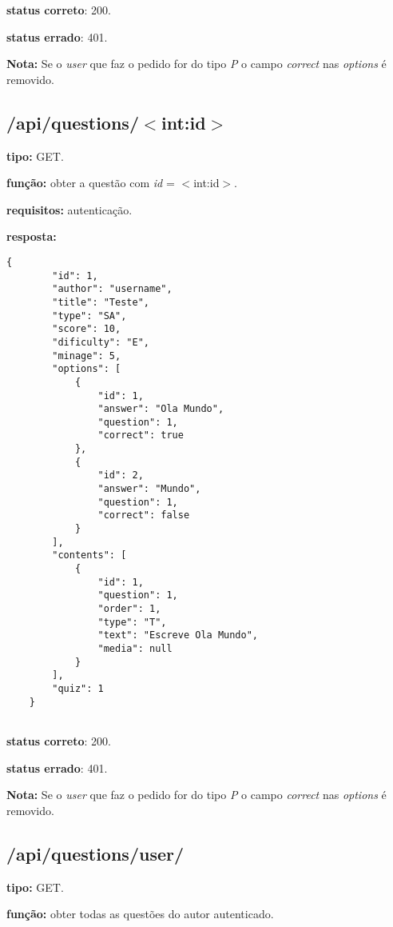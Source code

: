 \documentclass[11pt,a4paper]{report}
\begin{document}
\textbf{status correto}: 200.

\textbf{status errado}: 401.

\textbf{Nota:} Se o \emph{user} que faz o pedido for do tipo \emph{P} o campo \emph{correct} nas \emph{options} é removido.

\newpage

\subsection{/api/questions/$<$int:id$>$}

\textbf{tipo:} GET.

\textbf{função:} obter a questão com \emph{id} = $<$int:id$>$.

\textbf{requisitos:} autenticação.

\textbf{resposta:}

\begin{lstlisting}[style = code]
    {
        "id": 1,
        "author": "username",
        "title": "Teste",
        "type": "SA",
        "score": 10,
        "dificulty": "E",
        "minage": 5,
        "options": [
            {
                "id": 1,
                "answer": "Ola Mundo",
                "question": 1,
                "correct": true
            },
            {
                "id": 2,
                "answer": "Mundo",
                "question": 1,
                "correct": false
            }
        ],
        "contents": [
            {
                "id": 1,
                "question": 1,
                "order": 1,
                "type": "T",
                "text": "Escreve Ola Mundo",
                "media": null
            }
        ],
        "quiz": 1
    }
    
\end{lstlisting}

\textbf{status correto}: 200.

\textbf{status errado}: 401.

\textbf{Nota:} Se o \emph{user} que faz o pedido for do tipo \emph{P} o campo \emph{correct} nas \emph{options} é removido.

\newpage

\subsection{/api/questions/user/}

\textbf{tipo:} GET.

\textbf{função:} obter todas as questões do autor autenticado.
\end{document}
